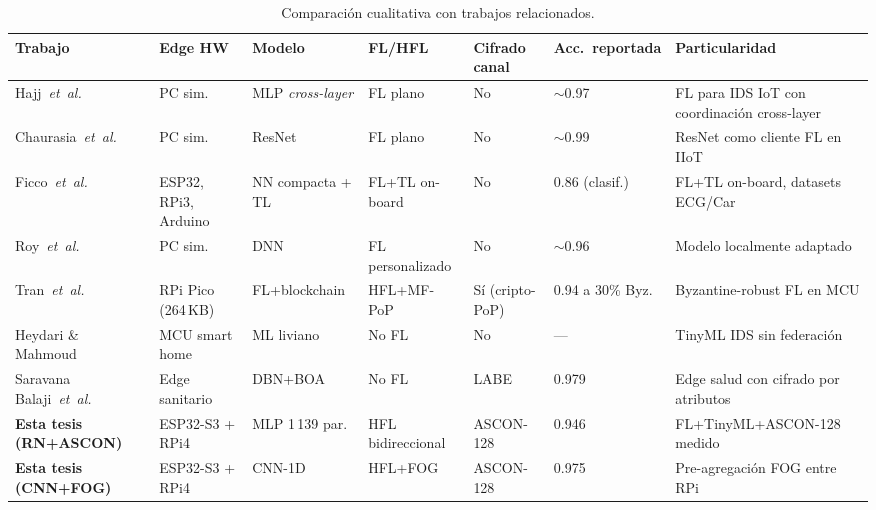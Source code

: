 \begin{table}[H]
\centering
\caption{Comparación cualitativa con trabajos relacionados.}
\label{tab:literatura_comparativa}
\scriptsize
\begin{tabular}{p{} p{} p{} p{} p{} p{} p{}}
\toprule
\textbf{Trabajo} & \textbf{Edge HW} & \textbf{Modelo} & \textbf{FL/HFL} & \textbf{Cifrado canal} & \textbf{Acc.\ reportada} & \textbf{Particularidad} \\
\midrule
Hajj~\textit{et~al.}~\cite{Hajj2023_CrossLayerFL_IDS} & PC sim. & MLP \emph{cross-layer} & FL plano & No & $\sim$0.97 & FL para IDS IoT con coordinación cross-layer \\
Chaurasia~\textit{et~al.}~\cite{Chaurasia2024_FL_ResNet_IIoT} & PC sim. & ResNet & FL plano & No & $\sim$0.99 & ResNet como cliente FL en IIoT \\
Ficco~\textit{et~al.}~\cite{Ficco2024_FL_TinyML_Onboard} & ESP32, RPi3, Arduino & NN compacta + TL & FL+TL on-board & No & 0.86 (clasif.) & FL+TL on-board, datasets ECG/Car \\
Roy~\textit{et~al.}~\cite{Roy2023_FL_AdaptedModel} & PC sim. & DNN & FL personalizado & No & $\sim$0.96 & Modelo localmente adaptado \\
Tran~\textit{et~al.}~\cite{Tran2026_EdgeTrustShard} & RPi Pico (264\,KB) & FL+blockchain & HFL+MF-PoP & Sí (cripto-PoP) & 0.94 a 30\% Byz. & Byzantine-robust FL en MCU \\
Heydari \& Mahmoud~\cite{HeydariMahmoud2025_TinyML_IDS} & MCU smart home & ML liviano & No FL & No & --- & TinyML IDS sin federación \\
Saravana Balaji~\textit{et~al.}~\cite{SaravanaBalaji2023_EdgeIoT_DL} & Edge sanitario & DBN+BOA & No FL & LABE & 0.979 & Edge salud con cifrado por atributos \\
\midrule
\textbf{Esta tesis (RN+ASCON)} & ESP32-S3 + RPi4 & MLP 1\,139 par. & HFL bidireccional & ASCON-128 & 0.946 & FL+TinyML+ASCON-128 medido \\
\textbf{Esta tesis (CNN+FOG)} & ESP32-S3 + RPi4 & CNN-1D & HFL+FOG & ASCON-128 & 0.975 & Pre-agregación FOG entre RPi \\
\bottomrule
\end{tabular}
\end{table}

